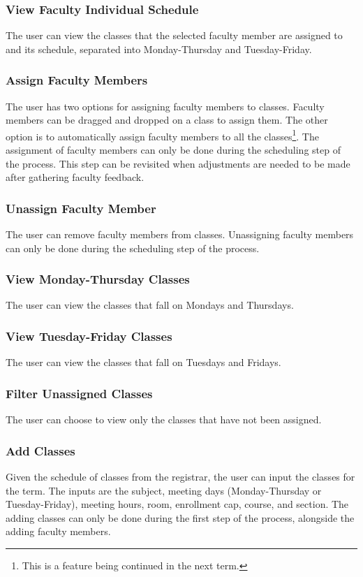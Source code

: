         \subsubsection{View Faculty Individual Schedule}
        The user can view the classes that the selected faculty member are assigned to and its schedule, separated into Monday-Thursday and Tuesday-Friday.
        
        \subsubsection{Assign Faculty Members}
        The user has two options for assigning faculty members to classes. Faculty members can be dragged and dropped on a class to assign them. The other option is to automatically assign faculty members to all the classes\footnote{This is a feature being continued in the next term.}. The assignment of faculty members can only be done during the scheduling step of the process. This step can be revisited when adjustments are needed to be made after gathering faculty feedback.
        
        \subsubsection{Unassign Faculty Member}
        The user can remove faculty members from classes. Unassigning faculty members can only be done during the scheduling step of the process.
        
        \subsubsection{View Monday-Thursday Classes}
        The user can view the classes that fall on Mondays and Thursdays.
        
        \subsubsection{View Tuesday-Friday Classes}
        The user can view the classes that fall on Tuesdays and Fridays.
        
        \subsubsection{Filter Unassigned Classes}
        The user can choose to view only the classes that have not been assigned.
        
        \subsubsection{Add Classes}
        Given the schedule of classes from the registrar, the user can input the classes for the term. The inputs are the subject, meeting days (Monday-Thursday or Tuesday-Friday), meeting hours, room, enrollment cap, course, and section. The adding classes can only be done during the first step of the process, alongside the adding faculty members.
        
